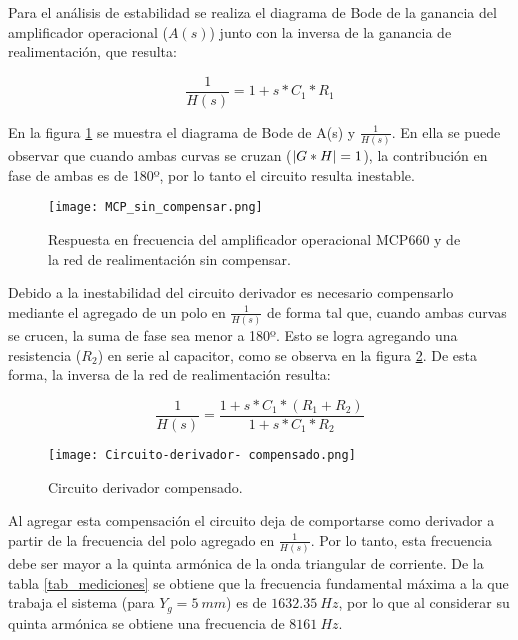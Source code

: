 Para el análisis de estabilidad se realiza el diagrama de Bode de la ganancia del amplificador operacional ($A(s)$) junto con la inversa de la ganancia de realimentación, que resulta:

\begin{equation} \label{eq_Aw_2}
	\frac{1}{H(s)}=1+s*C_1*R_1
\end{equation}

En la figura \ref{fig:img_MCP_sin_compensar} se muestra el diagrama de Bode de A(s) y $\frac{1}{H(s)}$. En ella se puede observar que cuando ambas curvas se cruzan ($\lvert G*H\rvert=1$), la contribución en fase de ambas es de 180º, por lo tanto el circuito resulta inestable. 

\begin{figure}[H]
	\centering
	\texttt{[image: MCP\_sin\_compensar.png]}
	\caption{Respuesta en frecuencia del amplificador operacional MCP660 y de la red de realimentación sin compensar.}
	\label{fig:img_MCP_sin_compensar}
\end{figure}

Debido a la inestabilidad del circuito derivador es necesario compensarlo mediante el agregado de un polo en $\frac{1}{H(s)}$ de forma tal que, cuando ambas curvas se crucen, la suma de fase sea menor a 180º. Esto se logra agregando una resistencia ($R_2$) en serie al capacitor, como se observa en la figura \ref{fig:img_Circuito_derivador_compensado}. De esta forma, la inversa de la red de realimentación resulta:

\begin{equation} \label{eq_MCP_compensado}
	\frac{1}{H(s)}=\frac{1+s*C_1*(R_1+R_2)}{1+s*C_1*R_2}
\end{equation}

\begin{figure}[H]
	\centering
	\texttt{[image: Circuito-derivador- compensado.png]}
	\caption{Circuito derivador compensado.}
	\label{fig:img_Circuito_derivador_compensado}
\end{figure}

Al agregar esta compensación el circuito deja de comportarse como derivador a partir de la frecuencia del polo agregado en $\frac{1}{H(s)}$. Por lo tanto, esta frecuencia debe ser mayor a la quinta armónica de la onda triangular de corriente. De la tabla \ref{tab_mediciones} se obtiene que la frecuencia fundamental máxima a la que trabaja el sistema (para $Y_g=5\:mm$) es de $1632.35\:Hz$, por lo que al considerar su quinta armónica se obtiene una frecuencia de $8161\:Hz$. 

